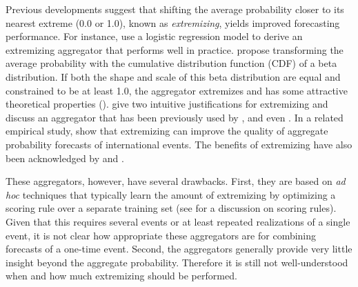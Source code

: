 \documentclass[11pt]{article}
\theoremstyle{definition}
\theoremstyle{definition}
\begin{document}
Previous developments suggest that shifting the average probability closer to its nearest extreme (0.0 or 1.0), known as \textit{extremizing}, yields improved forecasting performance. For instance, \cite{satopaa} use a logistic regression model to derive an extremizing aggregator that performs well in practice. \cite{Ranjan08} propose transforming the average probability with the cumulative distribution function (CDF) of a beta distribution. If both the shape and scale of this beta distribution are equal and constrained to be at least 1.0,  the aggregator extremizes and has some attractive theoretical properties (\cite{Wallsten2001}).  \cite{baron2014two} give two intuitive justifications for extremizing and discuss an aggregator that has been previously used by \cite{Erev1994, shlomi2010subjective}, and even \cite{karmarkar1978subjectively}. In a related empirical study, \cite{mellers} show that extremizing can improve the quality of aggregate probability forecasts of international events. The benefits of extremizing have also been acknowledged by \cite{turner2013forecast} and \cite{Ariely00theeffects}.

These aggregators, however, have several drawbacks. First, they are based on \textit{ad hoc} techniques that typically learn the amount of extremizing by optimizing a scoring rule over a separate training set (see \cite{Gneiting04strictlyproper} for a discussion on scoring rules). Given that this requires several events or at least repeated realizations of a single event, it is not clear how appropriate these aggregators are for combining forecasts of a one-time event. 
Second, the aggregators generally provide very little insight beyond the aggregate probability. Therefore it is still not well-understood when and how much extremizing should be performed. 
\end{document}
